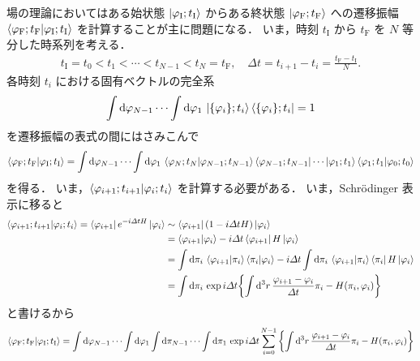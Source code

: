 \documentclass[dvipdfmx, a4paper]{jarticle}
\numberwithin{equation}{section}
\begin{document}
場の理論においてはある始状態 $\ket{\varphi_\mathrm{I}; t_\mathrm{I}}$ からある終状態 $\ket{\varphi_\mathrm{F}; t_\mathrm{F}}$ への遷移振幅 $\bra{\varphi_\mathrm{F}; t_\mathrm{F}}\ket{\varphi_\mathrm{I}; t_\mathrm{I}}$ を計算することが主に問題になる．
いま，時刻 $t_\mathrm{I}$ から $t_\mathrm{F}$ を $N$ 等分した時系列を考える．
\begin{align}
  t_\mathrm{I} = t_0 < t_1 < \cdots < t_{N-1} < t_N = t_\mathrm{F}, \quad \varDelta t = t_{i+1} - t_i = \frac{t_\mathrm{F} - t_\mathrm{I}}{N}.
\end{align}
各時刻 $t_i$ における固有ベクトルの完全系
\begin{align}
  \int \dd \varphi_{N-1} \cdots \int \dd \varphi_1\, \ket{\qty{\varphi_i}; t_i} \bra{\qty{\varphi_i}; t_i} = 1
\end{align}
を遷移振幅の表式の間にはさみこんで
\begin{align}
  \bra{\varphi_\mathrm{F}; t_\mathrm{F}}\ket{\varphi_\mathrm{I}; t_\mathrm{I}} = \int \dd \varphi_{N-1} \cdots \int \dd \varphi_1 \, \bra{\varphi_N; t_N}\ket{\varphi_{N-1}; t_{N-1}}\bra{\varphi_{N-1}; t_{N-1}} \cdots \ket{\varphi_1; t_1}\bra{\varphi_1; t_1}\ket{\varphi_0; t_0}
\end{align}
を得る．
いま，$\bra{\varphi_{i+1}; t_{i+1}}\ket{\varphi_i; t_i}$ を計算する必要がある．
いま，Schrödinger 表示に移ると
\begin{align}
  \bra{\varphi_{i+1}; t_{i+1}}\ket{\varphi_i; t_i} = \bra{\varphi_{i+1}}e^{-i \varDelta t H}\ket{\varphi_i} &\sim \bra{\varphi_{i+1}} \qty(1 - i\varDelta t H) \ket{\varphi_{i}} \notag \\
  &= \bra{\varphi_{i+1}}\ket{\varphi_i} - i\varDelta t \bra{\varphi_{i+1}}H \ket{\varphi_i} \notag \\
  &= \int \dd \pi_i \, \bra{\varphi_{i+1}}\ket{\pi_i}\bra{\pi_i}\ket{\varphi_i} - i\varDelta t \int \dd \pi_i \, \bra{\varphi_{i+1}}\ket{\pi_i}\bra{\pi_i} H \ket{\varphi_i} \notag \\
  &= \int \dd \pi_i \, \exp i\varDelta t \qty{\int \dd^3 r\, \frac{\varphi_{i+1}-\varphi_i}{\varDelta t} \pi_i - H(\pi_i, \varphi_i)}
\end{align}
と書けるから
\begin{align}
  \bra{\varphi_\mathrm{F}; t_\mathrm{F}}\ket{\varphi_\mathrm{I}; t_\mathrm{I}} = \int \dd \varphi_{N-1} \cdots \int \dd \varphi_1 \int \dd \pi_{N-1} \cdots \int \dd \pi_1 \, \exp i\varDelta t \sum_{i = 0}^{N-1} \qty{\int \dd^3 r\, \frac{\varphi_{i+1}-\varphi_i}{\varDelta t} \pi_i - H(\pi_i, \varphi_i)}
\end{align}
\end{document}
